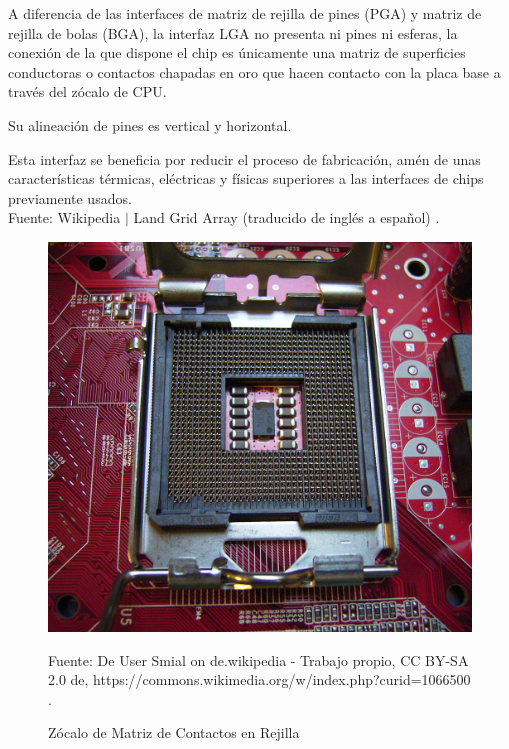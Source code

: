 \documentclass[conference]{IEEEtran}
\begin{document}
    \begin{displayquote}
        A diferencia de las interfaces de matriz de rejilla de pines (PGA) y
        matriz de rejilla de bolas (BGA), la interfaz LGA no presenta ni
        pines ni esferas, la conexión de la que dispone el chip es únicamente
        una matriz de superficies conductoras o contactos chapadas en oro que
        hacen contacto con la placa base a través del zócalo de CPU.

        \bigbreak

        Su alineación de pines es vertical y horizontal.

        \bigbreak

        Esta interfaz se beneficia por reducir el proceso de fabricación,
        amén de unas características térmicas, eléctricas y físicas
        superiores a las interfaces de chips previamente usados.\\
        \small
        Fuente: Wikipedia $\mid$ Land Grid Array (traducido de inglés a
        español) \cite{wikipedia-lga-2021D}.
    \end{displayquote}

    \begin{figure}[H]
        \centering
        \includegraphics[width=0.2\paperwidth]{images/lga-socket}
        \caption{Zócalo de Matriz de Contactos en Rejilla} \footnotesize
        Fuente: De User Smial on de.wikipedia - Trabajo propio, CC BY-SA 2.0
        de, https://commons.wikimedia.org/w/index.php?curid=1066500
        \cite{wikipedia-lga-2021D}.
    \end{figure}
\end{document}
